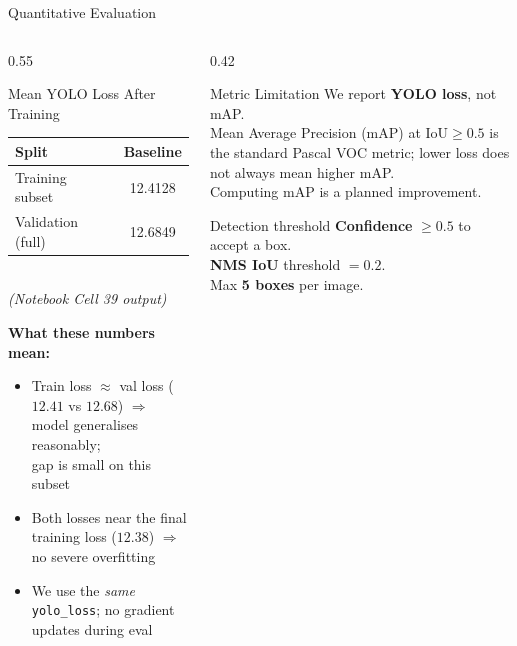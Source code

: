 \documentclass[aspectratio=169, 10pt]{beamer}
\begin{document}
\begin{frame}{Quantitative Evaluation}
\begin{columns}[T]
\begin{column}{0.55\textwidth}
  \begin{block}{Mean YOLO Loss After Training}
    \begin{tabular}{lc}
      \toprule
      \textbf{Split} & \textbf{Baseline} \\
      \midrule
      Training subset   & 12.4128 \\
      Validation (full) & 12.6849 \\
      \bottomrule
    \end{tabular}\\[4pt]
    \small\textit{(Notebook Cell 39 output)}
  \end{block}

  \vspace{0.1cm}
  \textbf{What these numbers mean:}
  \begin{itemize}
    \item Train loss $\approx$ val loss ($12.41$ vs $12.68$)
      $\Rightarrow$ model generalises reasonably;\\
      gap is small on this subset
    \item Both losses near the final\\training loss ($12.38$)
      $\Rightarrow$ no severe overfitting
    \item We use the \textit{same} \texttt{yolo\_loss};
      no gradient updates during eval
  \end{itemize}
\end{column}
\begin{column}{0.42\textwidth}
  \begin{alertblock}{Metric Limitation}
    We report \textbf{YOLO loss}, not mAP.\\[4pt]
    Mean Average Precision (mAP) at
    $\text{IoU}\geq 0.5$ is the standard
    Pascal VOC metric; lower loss does
    not always mean higher mAP.\\[4pt]
    Computing mAP is a planned improvement.
  \end{alertblock}

  \vspace{0.15cm}
  \begin{block}{Detection threshold}
    \textbf{Confidence} $\geq 0.5$ to accept a box.\\
    \textbf{NMS IoU} threshold $= 0.2$.\\
    Max \textbf{5 boxes} per image.
  \end{block}
\end{column}
\end{columns}
\end{frame}
\end{document}
